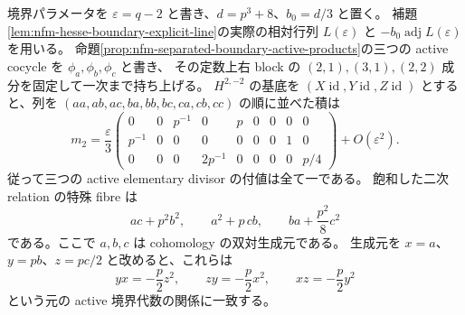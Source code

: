 \begin{proposition}[消えた三つの二次関係は一次で回復する]
\label{prop:nfm-boundary-first-jet-products}
境界パラメータを $\varepsilon=q-2$ と書き、$d=p^3+8$、$b_0=d/3$ と置く。
補題\ref{lem:nfm-hesse-boundary-explicit-line}の実際の相対行列
$L(\varepsilon)$ と $-b_0\operatorname{adj}L(\varepsilon)$ を用いる。
命題\ref{prop:nfm-separated-boundary-active-products}の三つの active cocycle を $\phi_a,\phi_b,\phi_c$ と書き、
その定数上右 block の $(2,1),(3,1),(2,2)$ 成分を固定して一次まで持ち上げる。
$H^{2,-2}$ の基底を $(X\operatorname{id},Y\operatorname{id},Z\operatorname{id})$
とすると、列を $(aa,ab,ac,ba,bb,bc,ca,cb,cc)$ の順に並べた積は
\[
 m_2=\frac{\varepsilon}{3}
 \begin{pmatrix}
 0&0&p^{-1}&0&p&0&0&0&0\\
 p^{-1}&0&0&0&0&0&0&1&0\\
 0&0&0&2p^{-1}&0&0&0&0&p/4
 \end{pmatrix}+O(\varepsilon^2).
\]
従って三つの active elementary divisor の付値は全て一である。
飽和した二次 relation の特殊 fibre は
\[
 ac+p^2b^2,\qquad a^2+p\,cb,\qquad ba+\frac{p^2}{8}c^2
\]
である。ここで $a,b,c$ は cohomology の双対生成元である。
生成元を $x=a$、$y=pb$、$z=pc/2$ と改めると、これらは
\[
 yx=-\frac p2z^2,\qquad zy=-\frac p2x^2,\qquad xz=-\frac p2y^2
\]
という元の active 境界代数の関係に一致する。
\end{proposition}
